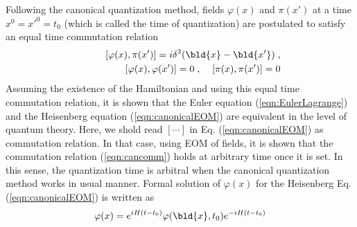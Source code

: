 Following the canonical quantization method, 
fields $\varphi(x)$ and $\pi(x')$ at a time 
$x^0 = x'^0 = t_0$ (which is called the time of quantization)
are postulated to satisfy an equal time commutation relation
\begin{eqnarray}
&&\;\;\;\;\;\;[ \varphi(x), \pi(x')] = i \delta^3 (\bld{x} - \bld{x'} )\;,
\label{eqn:cancomm}
\\
&&\left[ \varphi(x), \varphi(x') \right] = 0\;,\;\;\;\;\left[ \pi(x), \pi(x') \right] = 0
\nonumber
\end{eqnarray}
Assuming the existence of the Hamiltonian and using this equal time
commutation relation, it is shown that
the Euler equation (\ref{eqn:EulerLagrange}) and
the Heisenberg equation (\ref{eqn:canonicalEOM})
are equivalent in the level of quantum theory.
\cite{ref:NIsh.1-2}
Here, we shold read $[\cdots]$ in Eq. (\ref{eqn:canonicalEOM}) as
commutation relation.
In that case, using EOM of fields, it is shown that
the commutation relation (\ref{eqn:cancomm}) holds at
arbitrary time once it is set.\cite{ref:NIsh.1-2}
In this sense, the quantization time is arbitral when
the canonical quantization method works in usual manner.
Formal solution of $\varphi(x)$ for the Heisenberg Eq. (\ref{eqn:canonicalEOM})
is written as 
\begin{equation}
\varphi(x) = e^{iH(t-t_0)} \varphi(\bld{x}, t_0) e^{-iH(t-t_0)} 
\label{eqn:timeevophi}
\end{equation}
